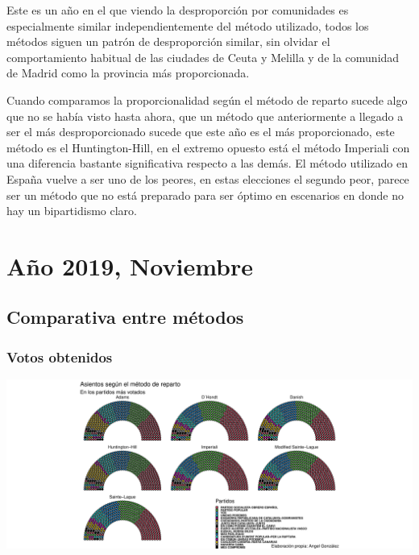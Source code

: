 \documentclass[12pt,a4paper,]{book}
\numberwithin{dummy}{section}
\theoremstyle{ocrenumbox}
\theoremstyle{blacknumex}
\theoremstyle{blacknumbox}
\theoremstyle{ocrenum}
\theoremstyle{ocrenum}
\begin{document}
Este es un año en el que viendo la desproporción por comunidades es
especialmente similar independientemente del método utilizado, todos los
métodos siguen un patrón de desproporción similar, sin olvidar el
comportamiento habitual de las ciudades de Ceuta y Melilla y de la
comunidad de Madrid como la provincia más proporcionada.

Cuando comparamos la proporcionalidad según el método de reparto sucede
algo que no se había visto hasta ahora, que un método que anteriormente
a llegado a ser el más desproporcionado sucede que este año es el más
proporcionado, este método es el Huntington-Hill, en el extremo opuesto
está el método Imperiali con una diferencia bastante significativa
respecto a las demás. El método utilizado en España vuelve a ser uno de
los peores, en estas elecciones el segundo peor, parece ser un método
que no está preparado para ser óptimo en escenarios en donde no hay un
bipartidismo claro.

\hypertarget{auxf1o-2019-noviembre}{%
\section{Año 2019, Noviembre}\label{auxf1o-2019-noviembre}}

\hypertarget{comparativa-entre-muxe9todos-14}{%
\subsection{Comparativa entre
métodos}\label{comparativa-entre-muxe9todos-14}}

\hypertarget{votos-obtenidos-14}{%
\subsubsection{Votos obtenidos}\label{votos-obtenidos-14}}

\begin{center}\includegraphics[width=0.95\linewidth]{figurasR/unnamed-chunk-137-1} \end{center}
\end{document}
